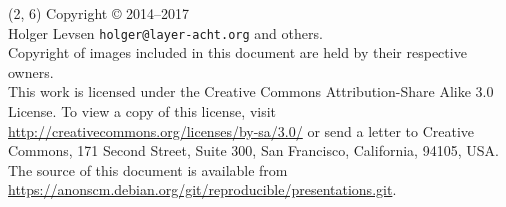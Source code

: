\documentclass[14pt,aspectratio=169]{beamer}
\newif\ifplacelogo
\begin{document}
\placelogotrue

\begin{frame}{}
\begin{textblock}{12}(2, 6)
    \tiny{
      Copyright \copyright{} 2014--2017 \\
         Holger Levsen \texttt{holger@layer-acht.org} and others.\\[3.0mm]
      Copyright of images included in this document are held by
      their respective owners.
      \\[3.0mm]
      This work is licensed under the \alert{Creative Commons
        Attribution-Share Alike 3.0} License.  To view a copy of this
      license, visit
      \url{http://creativecommons.org/licenses/by-sa/3.0/} or send a
      letter to Creative Commons, 171 Second Street, Suite 300, San
      Francisco, California, 94105, USA.
      \\[2.0mm]
      The source of this document is available from
      \url{https://anonscm.debian.org/git/reproducible/presentations.git}.
    }
  \end{textblock}
\end{frame}
\end{document}
